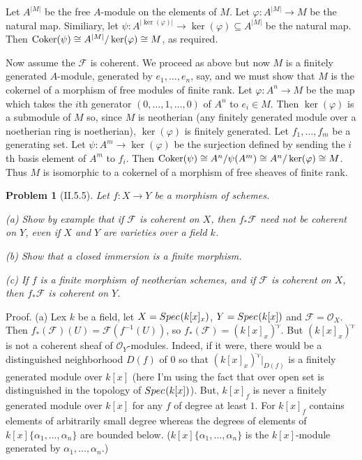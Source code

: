 \documentclass[12pt]{article}
\newcommand{\sox}{\mathcal{O}_X}
\newcommand{\soy}{\mathcal{O}_Y}
\renewcommand{\sf}{\mathcal{F}}
\newcommand{\isom}{\cong}
\newcommand{\into}{\rightarrow}
\newcommand{\coker}{\mbox{\rm Coker}}
\newtheorem{prob}{Problem}
\renewcommand{\phi}{\varphi}
\newcommand{\spec}{Spec \hspace{.01in}}
\newcommand{\proof}{\mbox{\sc Proof.\hspace{.1in}}}
\begin{document}
Let $A^{|M|}$ be the free $A$-module on the elements
of $M$. 
Let $\phi:A^{|M|}\into M$ be the natural map.
Similiary, let $\psi:A^{|\ker(\phi)|}\into\ker(\phi)
\subseteq A^{|M|}$ be the natural map.
Then $\coker(\psi)\isom A^{|M|}/\ker(\phi)\isom M$,
as required.

Now assume the $\sf$ is coherent. We proceed as above
but now $M$ is a finitely generated $A$-module,
generated by $e_1,\ldots,e_n$, say, and we must
show that $M$ is the cokernel of a morphism of
free modules of finite rank. Let $\phi:A^n\into M$
be the map which takes the $i$th generator
$(0,\ldots,1,\ldots,0)$ of $A^n$ to $e_i\in M$. 
Then $\ker(\phi)$ is a submodule of $M$ so, since
$M$ is neotherian (any finitely generated module
over a noetherian ring is noetherian), $\ker(\phi)$
is finitely generated. Let $f_1,\ldots,f_m$ be
a generating set. Let $\psi:A^m\into\ker(\phi)$ be
the surjection defined by sending the $i$th
basis element of $A^m$ to $f_i$. Then 
$\coker(\psi)\isom A^n/\psi(A^m)\isom A^n/\ker(\phi)\isom M$.
Thus $M$ is isomorphic to a cokernel of a morphism
of free sheaves of finite rank. 
 




\begin{prob}[II.5.5]
Let $f:X\rightarrow Y$ be a morphism of schemes.

(a) Show by example that if $\sf$ is coherent on $X$, then
$f_{*}\sf$ need not be coherent on $Y$, even if $X$ and $Y$
are varieties over a field $k$.

(b) Show that a closed immersion is a finite morphism.

(c) If $f$ is a finite morphism of neotherian schemes, and if 
$\sf$ is coherent on $X$, then $f_{*}\sf$ is coherent on $Y$.
\end{prob}
\proof
(a) Lex $k$ be a field, let $X=\spec (k[x]_x)$,
$Y=\spec (k[x])$ and $\sf=\sox$. Then 
$f_{*}(\sf)(U)=\sf(f^{-1}(U))$, so
$f_{*}(\sf)=(k[x]_x)^{\tilde{}_Y}$.
But $(k[x]_x)^{\tilde{}_Y}$ is not a coherent sheaf
of $\soy$-modules. Indeed, if it were, there would
be a distinguished neighborhood $D(f)$ of $0$ so that
$(k[x]_x)^{\tilde{}_Y}|_{D(f)}$ 
is a finitely generated module over $k[x]$ (here I'm
using the fact that over open set is distinguished
in the topology of $\spec(k[x])$). But, 
$k[x]_f$ is never a finitely generated module over
$k[x]$ for any $f$ of degree at least $1$. For $k[x]_f$
contains elements of arbitrarily small degree whereas
the degrees of elements of $k[x]\{\alpha_1,\ldots,\alpha_n\}$
are bounded below. ($k[x]\{\alpha_1,\ldots,\alpha_n\}$
is the $k[x]$-module generated by $\alpha_1,\ldots,\alpha_n$.)
\end{document}
